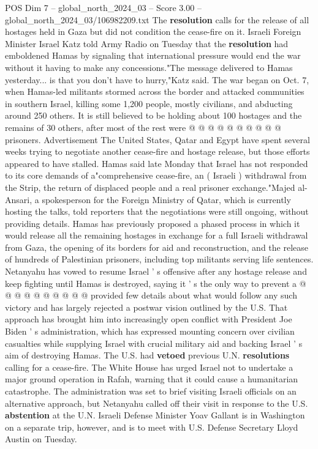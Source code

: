 \begin{textsample}{POS Dim 7 – global\_north\_2024\_03 – Score 3.00 – global\_north\_2024\_03/106982209.txt}
The \textbf{resolution} calls for the release of all hostages held in Gaza but did not condition the cease-fire on it.
Israeli Foreign Minister Israel Katz told Army Radio on Tuesday that the \textbf{resolution} had emboldened Hamas by signaling that international pressure would end the war without it having to make any concessions."The message delivered to Hamas yesterday... is that you don't have to hurry,"Katz said.
The war began on Oct. 7, when Hamas-led militants stormed across the border and attacked communities in southern Israel, killing some 1,200 people, mostly civilians, and abducting around 250 others.
It is still believed to be holding about 100 hostages and the remains of 30 others, after most of the rest were @ @ @ @ @ @ @ @ @ @ prisoners.
Advertisement The United States, Qatar and Egypt have spent several weeks trying to negotiate another cease-fire and hostage release, but those efforts appeared to have stalled.
Hamas said late Monday that Israel has not responded to its core demands of a"comprehensive cease-fire, an ( Israeli ) withdrawal from the Strip, the return of displaced people and a real prisoner exchange."Majed al-Ansari, a spokesperson for the Foreign Ministry of Qatar, which is currently hosting the talks, told reporters that the negotiations were still ongoing, without providing details.
Hamas has previously proposed a phased process in which it would release all the remaining hostages in exchange for a full Israeli withdrawal from Gaza, the opening of its borders for aid and reconstruction, and the release of hundreds of Palestinian prisoners, including top militants serving life sentences.
Netanyahu has vowed to resume Israel ' s offensive after any hostage release and keep fighting until Hamas is destroyed, saying it ' s the only way to prevent a @ @ @ @ @ @ @ @ @ @ provided few details about what would follow any such victory and has largely rejected a postwar vision outlined by the U.S.
That approach has brought him into increasingly open conflict with President Joe Biden ' s administration, which has expressed mounting concern over civilian casualties while supplying Israel with crucial military aid and backing Israel ' s aim of destroying Hamas.
The U.S. had \textbf{vetoed} previous U.N. \textbf{resolutions} calling for a cease-fire.
The White House has urged Israel not to undertake a major ground operation in Rafah, warning that it could cause a humanitarian catastrophe.
The administration was set to brief visiting Israeli officials on an alternative approach, but Netanyahu called off their visit in response to the U.S. \textbf{abstention} at the U.N.
Israeli Defense Minister Yoav Gallant is in Washington on a separate trip, however, and is to meet with U.S.
Defense Secretary Lloyd Austin on Tuesday.

\end{textsample}
